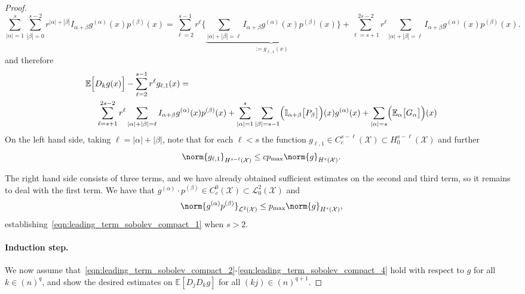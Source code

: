 \documentclass{article}
\newcommand{\abs}[1]{\left \lvert #1 \right \rvert}
\newcommand{\1}{\mathbf{1}}
\newcommand{\Xset}{\mathcal{X}}
\newcommand{\Leb}{\mathcal{L}}
\newcommand{\Ebb}{\mathbb{E}}
\newcommand{\Ibb}{\mathbb{I}}
\theoremstyle{alden}
\theoremstyle{aldenthm}
\theoremstyle{definition}
\theoremstyle{remark}
\begin{document}
\begin{proof}
	\begin{equation*}
	\sum_{\abs{\alpha} = 1}^{s} \sum_{\abs{\beta} = 0}^{s - 2} r^{\abs{\alpha} + \abs{\beta}} I_{\alpha + \beta} g^{(\alpha)}(x) p^{(\beta)}(x) = \sum_{\ell = 2}^{s - 1} r^{\ell} \Biggl\{\underbrace{\sum_{\abs{\alpha} + \abs{\beta} = \ell} I_{\alpha + \beta} g^{(\alpha)}(x) p^{(\beta)}(x)}_{:=g_{\ell,1}(x)}\Biggr\} + \sum_{\ell = s + 1}^{2s - 2} r^{\ell} \sum_{\abs{\alpha} + \abs{\beta} = \ell} I_{\alpha + \beta} g^{(\alpha)}(x) p^{(\beta)}(x).
	\end{equation*}
	and therefore
	\begin{align*}
	& \Ebb\Bigl[D_kg(x)\Bigr] - \sum_{\ell = 2}^{s - 1} r^{\ell} g_{\ell,1}(x) = \\ & ~~~~ \sum_{\ell = s + 1}^{2s - 2} r^{\ell} \sum_{\abs{\alpha} + \abs{\beta} = \ell} I_{\alpha + \beta} g^{(\alpha)}(x) p^{(\beta)}(x) +  \sum_{\abs{\alpha} = 1}^{s} \sum_{\abs{\beta} = s - 1} \Bigl(\Ibb_{\alpha + \beta}\bigl[P_{\beta}\bigr]\Bigr)(x) g^{(\alpha)}(x) + \sum_{\abs{\alpha} = s} \Bigl(\Ebb_{\alpha}\bigl[G_{\alpha}\bigr]\Bigr)(x)
	\end{align*}
	On the left hand side, taking $\ell = \abs{\alpha} + \abs{\beta}$, note that for each $\ell < s$ the function $g_{\ell,1} \in C_c^{s - \ell}(\Xset) \subset H_0^{s - \ell}(\Xset)$ and further
	\begin{equation}
	\label{eqn:leading_term_sobolev_compact_pf3}
	\norm{g_{\ell,1}}_{H^{s - \ell}(\Xset)} \leq c p_{\max} \norm{g}_{H^s(\Xset)}.
	\end{equation}
	
	The right hand side consists of three terms, and we have already obtained sufficient estimates on the second and third term, so it remains to deal with the first term. We have that $g^{(\alpha)}\cdot p^{(\beta)} \in C_c^{0}(\Xset) \subset \Leb_0^2(\Xset)$ and
	\begin{equation}
	\label{eqn:leading_term_sobolev_compact_pf4}
	\norm{g^{(\alpha)}p^{(\beta)}}_{\Leb^2(\Xset)} \leq p_{\max} \norm{g}_{H^s(\Xset)},
	\end{equation}
	establishing~\eqref{eqn:leading_term_sobolev_compact_1} when $s > 2$.
	
	\paragraph{Induction step.}
	We now assume that~\eqref{eqn:leading_term_sobolev_compact_2}-\eqref{eqn:leading_term_sobolev_compact_4} hold with respect to $g$ for all $k \in (n)^q$, and show the desired estimates on $\Ebb[D_jD_kg]$ for all $(kj) \in (n)^{q + 1}$.
	

\end{proof}
\end{document}
